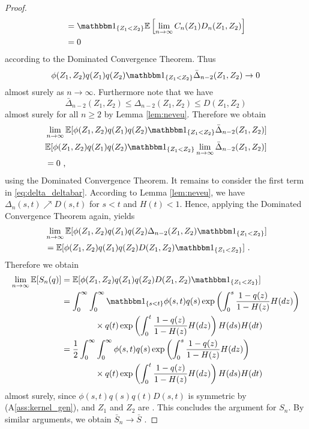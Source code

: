 \begin{lemma}
\begin{proof}
\begin{align*}
			&= \I{Z_1<Z_2} \E\left[\lim\limits_{n\to\infty}C_n(Z_1)D_n(Z_1,Z_2)\right]\\ 
			&= 0 
		\end{align*}
		according to the Dominated Convergence Theorem. Thus 
		$$\phi(Z_1,Z_2)q(Z_1)q(Z_2)\I{Z_1<Z_2} \bar\Delta_{n-2}(Z_1,Z_2) \to 0$$
		almost surely as $n\to\infty$. Furthermore note that we have 
		$$\bar\Delta_{n-2}(Z_1,Z_2)\leq \Delta_{n-2}(Z_1,Z_2) \leq D(Z_1,Z_2)$$
		almost surely for all $n\geq 2$ by Lemma \ref{lem:neveu}. Therefore we obtain
		\begin{align*}
			&\lim\limits_{n\to\infty} \E[\phi(Z_1,Z_2)q(Z_1)q(Z_2)\I{Z_1<Z_2} \bar\Delta_{n-2}(Z_1,Z_2)] \\
			& \E[\phi(Z_1,Z_2)q(Z_1)q(Z_2)\I{Z_1<Z_2} \lim\limits_{n\to\infty} \bar\Delta_{n-2}(Z_1,Z_2)] \\
			&= 0\mcomma
		\end{align*}
		using the Dominated Convergence Theorem.
		It remains to consider the first term in \eqref{eq:delta_deltabar}. According to Lemma \ref{lem:neveu}, we have $\Delta_{n}(s,t) \nearrow D(s,t)$ for $s<t$ and $H(t)<1$. Hence, applying the Dominated Convergence Theorem again, yields
		\begin{align*}
			&\lim\limits_{n\to\infty}\E[\phi(Z_1,Z_2)q(Z_1)q(Z_2) \Delta_{n-2}(Z_1, Z_2) \I{Z_1<Z_2}] \\
			&= \E[\phi(Z_1,Z_2)q(Z_1)q(Z_2) D(Z_1, Z_2) \I{Z_1<Z_2}]\mdot
		\end{align*}
		Therefore we obtain 
		\begin{align*}
		\lim\limits_{n\to\infty}\E[S_n(q)]&= \E[\phi(Z_1,Z_2)q(Z_1)q(Z_2) D(Z_1, Z_2) \I{Z_1<Z_2}]\\
		&= \int_{0}^{\infty}\int_{0}^{\infty} \I{s<t} \phi(s,t)q(s)\exp\left(\int_{0}^{s} \frac{1-q(z)}{1-H(z)} H(dz)\right) \\
		&\qquad\qquad \times q(t) \exp\left(\int_{0}^{t} \frac{1-q(z)}{1-H(z)} H(dz)\right) H(ds)H(dt)\\
		&= \frac{1}{2}\int_{0}^{\infty}\int_{0}^{\infty}\phi(s,t)q(s) \exp\left(\int_{0}^{s} \frac{1-q(z)}{1-H(z)} H(dz)\right)\\
		&\qquad\qquad \times q(t)\exp\left(\int_{0}^{t} \frac{1-q(z)}{1-H(z)} H(dz)\right) H(ds)H(dt)
		\end{align*}
		almost surely, since $\phi(s,t)q(s)q(t)D(s,t)$ is symmetric by (A\ref{ass:kernel_gen}), and $Z_1$ and $Z_2$ are \iid. This concludes the argument for $S_n$. By similar arguments, we obtain $\bar{S}_n \to \bar{S}$ \wpo. 
	\end{proof}
\end{lemma}
%
%
%
%
